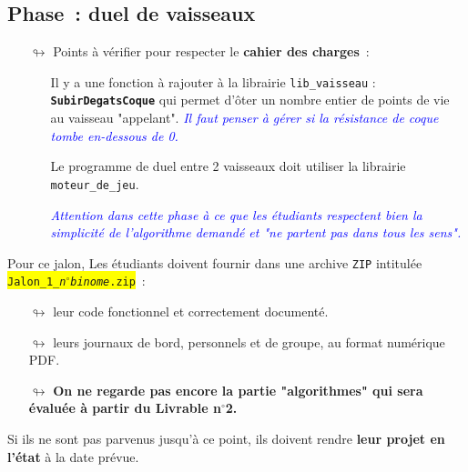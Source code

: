 \documentclass[10pt, fleqn, a4paper]{article}
\newcommand{\itcolor}[2]{\textcolor{#1}{\textit{#2}}}
\newcommand\myframecolor{}
\newcommand\mybgcolor{}
\newenvironment{mycolorbox}[2]
{
\def\myframecolor{#1}
\def\mybgcolor{#2}
\begingroup
\begin{lrbox}{\mytextbox}
\begin{minipage}[t]{\textwidth}
}
{
\end{minipage}\end{lrbox}
\fcolorbox{\myframecolor}{\mybgcolor}{\usebox{\mytextbox}}
\endgroup
}
\newcounter{quest}
\begin{document}
\addtocounter{quest}{1}
\subsection*{Phase~\thequest : \og{}duel de vaisseaux\fg{}}
\label{phase_duel}

\begin{itemize}
\item[$\looparrowright$] Points à vérifier pour respecter le \textbf{cahier des charges}~:
\begin{itemize}
\item[\ding{223}] Il y a une fonction à rajouter à la librairie \texttt{lib\_vaisseau} : \texttt{\bf SubirDegatsCoque} qui permet d'ôter un nombre entier de points de vie au vaisseau "appelant". \itcolor{blue}{Il faut penser à gérer si la résistance de coque tombe en-dessous de 0.}
\item[\ding{223}] Le programme de duel entre 2 vaisseaux doit utiliser la librairie \texttt{moteur\_de\_jeu}.
\item[\ding{223}] \itcolor{blue}{Attention dans cette phase à ce que les étudiants respectent bien la simplicité de l'algorithme demandé et "ne partent pas dans tous les sens".}
\end{itemize}
\end{itemize}

\vspace{5mm}
\begin{mycolorbox}{black}{orange}
Pour ce jalon, Les étudiants doivent fournir dans une archive \texttt{ZIP} intitulée\\ \colorbox{yellow}{\texttt{Jalon\_1\_\textit{n$^\circ$binome}.zip}}~:
\begin{itemize}
\item[$\looparrowright$] leur code fonctionnel et correctement documenté.
\item[$\looparrowright$] leurs journaux de bord, personnels et de groupe, au format numérique PDF.
\item[$\looparrowright$] \textbf{On ne regarde pas encore la partie "algorithmes" qui sera évaluée à partir du Livrable n$^\circ$2.}
\end{itemize}
\begin{mycolorbox}{black}{yellow}Si ils ne sont pas parvenus jusqu'à ce point, ils doivent rendre \textbf{leur projet en l'état} à la date prévue.\end{mycolorbox}
\end{mycolorbox}
\end{document}
